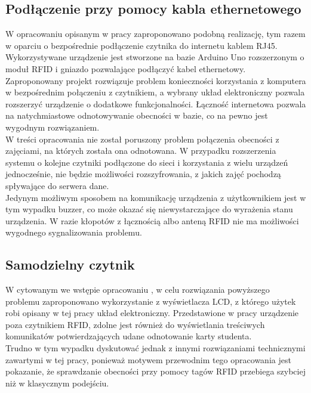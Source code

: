 \documentclass[declaration,shortabstract, mgr]{iithesis}
\begin{document}
\subsection{Podłączenie przy pomocy kabla ethernetowego}
\indent W opracowaniu opisanym w pracy \cite{rfid_serial} zaproponowano podobną realizację, tym razem w oparciu o bezpośrednie podłączenie czytnika do internetu kablem RJ45. Wykorzystywane urządzenie jest stworzone na bazie Arduino Uno rozszerzonym o moduł RFID i gniazdo pozwalające podłączyć kabel ethernetowy. \\
\indent Zaproponowany projekt rozwiązuje problem konieczności korzystania z komputera w bezpośrednim połączeniu z czytnikiem, a wybrany układ elektroniczny pozwala rozszerzyć urządzenie o dodatkowe funkcjonalności. Łączność internetowa pozwala na natychmiastowe odnotowywanie obecności w bazie, co na pewno jest wygodnym rozwiązaniem. \\
\indent W treści opracowania nie został poruszony problem połączenia obecności z zajęciami, na których została ona odnotowana. W przypadku rozszerzenia systemu o kolejne czytniki podłączone do sieci i korzystania z wielu urządzeń jednocześnie, nie będzie możliwości rozszyfrowania, z jakich zajęć pochodzą spływające do serwera dane. \\
\indent Jedynym możliwym sposobem na komunikację urządzenia z użytkownikiem jest w tym wypadku buzzer, co może okazać się niewystarczające do wyrażenia stanu urządzenia. W razie kłopotów z łącznością albo anteną RFID nie ma możliwości wygodnego sygnalizowania problemu.

\subsection{Samodzielny czytnik }
\indent W cytowanym we wstępie opracowaniu \cite{lcd}, w celu rozwiązania powyższego problemu zaproponowano wykorzystanie z wyświetlacza LCD, z którego użytek robi opisany w tej pracy układ elektroniczny. Przedstawione w pracy urządzenie poza czytnikiem RFID, zdolne jest również do wyświetlania treściwych komunikatów potwierdzających udane odnotowanie karty studenta. \\
\indent Trudno w tym wypadku dyskutować jednak z innymi rozwiązaniami technicznymi zawartymi w tej pracy, ponieważ motywem przewodnim tego opracowania jest pokazanie, że sprawdzanie obecności przy pomocy tagów RFID przebiega szybciej niż w klasycznym podejściu.
\end{document}
